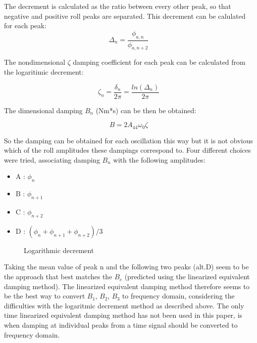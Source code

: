     The decrement is calculated as the ratio between every other peak, so
that negative and positive roll peaks are separated. This decrement can
be calulated for each peak:
\[ \Delta_n = \frac{\phi_{a,n}}{\phi_{a,n+2}}\]

    The nondimensional $\zeta$ damping coefficient for each peak can be
calculated from the logaritimic decrement:

    \[\zeta_n = \frac{\delta_n}{2\pi}=\frac{ln(\Delta_n)}{2\pi}\]

    The dimensional damping $B_n$ (Nm*s) can be then be obtained:
 
            
    
    \begin{equation}
B = 2 A_{44} \omega_{0} \zeta
\label{eq:equation}
\end{equation}

    

    So the damping can be obtained for each oscillation this way but it is
not obvious which of the roll amplitudes these dampings correspond to.
Four different choices were tried, associating damping $B_n$ with the
following amplitudes:

\begin{itemize}
\item A : $\phi_n$
\item B : $\phi_{n+1}$
\item C : $\phi_{n+2}$
\item D : $(\phi_n + \phi_{n+1} + \phi_{n+2})/3$
\end{itemize}

    \begin{figure}
        \begin{center}\end{center}
        \caption{Logarithmic decrement}
        \label{fig:logarithmic_decrement}
    \end{figure}
    
    Taking the mean value of peak n and the following two peaks (alt.D) seem
to be the approach that best matches the $B_e$ (predicted using the
linearized equivalent damping method). The linearized equivalent damping
method therefore seems to be the best way to convert $B_1$, $B_2$,
$B_3$ to frequency domain, considering the difficulties with the
logaritmic decrement method as described above. The only time linearized
equivalent damping method has not been used in this paper, is when
damping at individual peaks from a time signal should be converted to
frequency domain.

